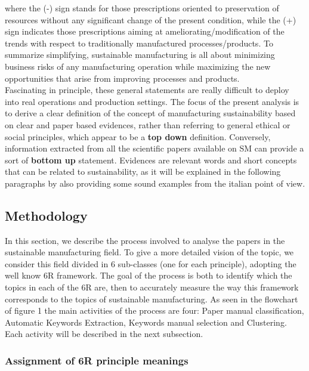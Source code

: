 \documentclass[]{book}
\begin{document}
where the (-) sign stands for those prescriptions oriented to
preservation of resources without any significant change of the present
condition, while the (+) sign indicates those prescriptions aiming at
ameliorating/modification of the trends with respect to traditionally
manufactured processes/products. To summarize simplifying, sustainable
manufacturing is all about minimizing business risks of any
manufacturing operation while maximizing the new opportunities that
arise from improving processes and products.\\
Fascinating in principle, these general statements are really difficult
to deploy into real operations and production settings. The focus of the
present analysis is to derive a clear definition of the concept of
manufacturing sustainability based on clear and paper based evidences,
rather than referring to general ethical or social principles, which
appear to be a \textbf{top down} definition. Conversely, information
extracted from all the scientific papers available on SM can provide a
sort of \textbf{bottom up} statement. Evidences are relevant words and
short concepts that can be related to sustainability, as it will be
explained in the following paragraphs by also providing some sound
examples from the italian point of view.

\subsection{Methodology}\label{methodology-2}

In this section, we describe the process involved to analyse the papers
in the sustainable manufacturing field. To give a more detailed vision
of the topic, we consider this field divided in 6 sub-classes (one for
each principle), adopting the well know 6R framework. The goal of the
process is both to identify which the topics in each of the 6R are, then
to accurately measure the way this framework corresponds to the topics
of sustainable manufacturing. As seen in the flowchart of figure 1 the
main activities of the process are four: Paper manual classification,
Automatic Keywords Extraction, Keywords manual selection and Clustering.
Each activity will be described in the next subsection.

\subsubsection*{Assignment of 6R principle
meanings}\label{assignment-of-6r-principle-meanings}
\end{document}
